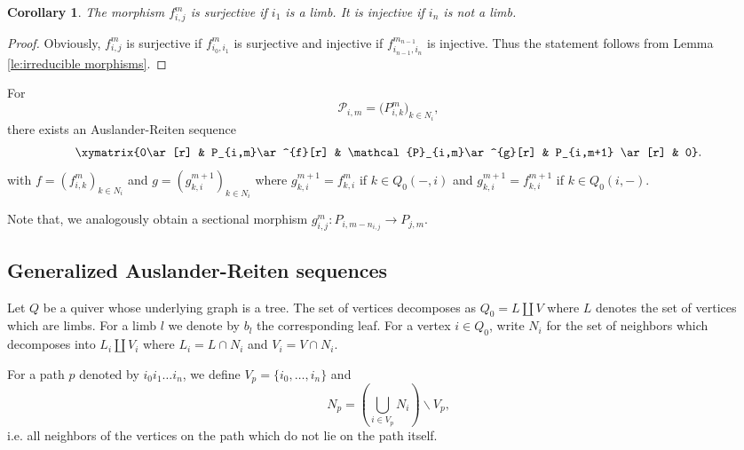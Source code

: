 \documentclass{amsart}
\newcommand{\sayT}[1]{\say[T]{#1}}
\newtheorem{corollary}[theorem]{Corollary}
\numberwithin{equation}{section}
\newcommand{\cP}{\mathcal{P}}
\newcommand{\Ses}[5]{\xymatrix{0\ar[r] & #1\ar^{#4}[r] & #2\ar^{#5}[r] & #3 \ar[r] & 0}}
\begin{document}
\begin{corollary}
The morphism $f_{i,j}^m$ is surjective if $i_1$ is a limb. It is injective if $i_n$ is not a limb.\sayT{what about $m$?}
\end{corollary}
\begin{proof}
Obviously, $f_{i,j}^m$ is surjective if $f_{i_0,i_1}^m$ is surjective and injective if $f_{i_{n-1},i_n}^{m_{n-1}}$ is injective. Thus the statement follows from Lemma \ref{le:irreducible morphisms}.
\end{proof}

For 
$$\cP_{i,m}=\big(P_{i,k}^m\big)_{k\in N_i},$$
there exists an Auslander-Reiten sequence
$$\Ses{P_{i,m}}{\cP_{i,m}}{P_{i,m+1}}{f}{g}.$$
with $f=(f_{i,k}^m)_{k\in N_i}$ and $g=(g_{k,i}^{m+1})_{k\in N_i}$ where $g^{m+1}_{k,i}=f_{k,i}^m$ if $k\in Q_0(-,i)$ and $g^{m+1}_{k,i}=f_{k,i}^{m+1}$ if $k\in Q_0(i,-)$.

Note that,  we analogously obtain a sectional morphism $g_{i,j}^m:P_{i,m-n_{i,j}}\to P_{j,m}$.




\subsection{Generalized Auslander-Reiten sequences}
Let $Q$ be a quiver whose underlying graph is a tree. The set of vertices decomposes as 
$Q_0=L\coprod V$ where $L$ denotes the set of vertices which are limbs. For a limb $l$ we denote by $b_l$ the corresponding leaf. For a vertex $i\in Q_0$, write 
$N_i$ for the set of neighbors which decomposes into $L_i\coprod V_i$ where $L_i=L\cap N_i$ and $V_i=V\cap N_i$. 

For a path $p$ denoted by $i_0i_1\ldots i_n$, we define $V_p=\{i_0,\ldots,i_n\}$ and 
$$N_p=\left(\bigcup_{i\in V_p}N_i\right)\backslash V_p,$$
i.e. all neighbors of the vertices on the path which do not lie on the path itself.
\end{document}
